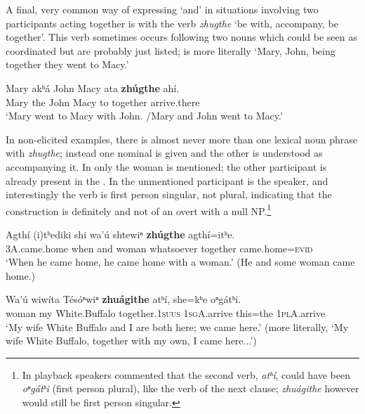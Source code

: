 \documentclass[output=paper]{LSP/langsci}
\begin{document}
 A final, very common way of expressing  `and' in situations involving two participants acting together is with the verb \textit{zhugthe} `be with, accompany, be together'. This verb sometimes occurs following two nouns which could be seen as coordinated but are probably just listed;  is more literally `Mary, John, being together they went to Macy.'

\begin{exe}	
\ex\label{ex:rudin:29}
\gll Mary akʰá  John	Macy ata 	\textbf{zhúgthe} 	ahí. \\
Mary the John Macy to  together arrive.there \\
\trans `Mary went to Macy with John. /Mary and John went to Macy.'
\end{exe}

In non-elicited examples, there is almost never more than one lexical noun phrase with \textit{zhugthe}; instead one nominal is given and the other is understood as accompanying it. In  only the woman is mentioned; the other participant is already present in the . In  the unmentioned participant is the speaker, and interestingly the verb is first person singular, not plural, indicating that the construction is definitely  and not  of an overt with a null NP.\footnote{In playback speakers commented that the second verb, \textit{atʰí}, could have been \textit{oⁿgátʰi} (first person plural), like the verb of the next clause; \textit{zhuágithe} however would still be first person singular.}   

\ea\label{ex:rudin:30}
\gll Agthí (i)tʰediki shi wa'ú shtewiⁿ \textbf{zhúgthe} agthí=itʰe.\\
\textsc{3A}.came.home 	when and woman whatsoever together came.home=\textsc{evid}\\
\trans `When he came home, he came home with a woman.' (He and some woman came home.)
\z

\ea\label{ex:rudin:31}
\gll Wa'ú  wiwíta Tésóⁿwiⁿ \textbf{zhuágithe}  atʰí, she=kʰe oⁿgátʰi.\\
woman 	my  White.Buffalo together.1\textsc{suus}  \textsc{1sgA}.arrive	this=the 	\textsc{1plA}.arrive\\
\trans `My wife White Buffalo and I are both here; we came here.' (more literally, `My wife White Buffalo, together with my own, I came here...')
\z
\end{document}
